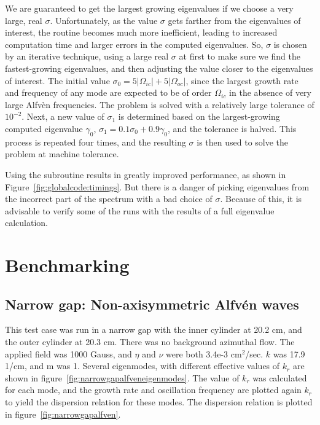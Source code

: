 \documentclass[letterpaper]{article}
\begin{document}
We are guaranteed to get the largest growing eigenvalues if we choose
a very large, real $\sigma$. Unfortunately, as the value $\sigma$ gets
farther from the eigenvalues of interest, the routine becomes much
more inefficient, leading to increased computation time and larger
errors in the computed eigenvalues. So, $\sigma$ is chosen by an
iterative technique, using a large real $\sigma$ at first to make sure
we find the fastest-growing eigenvalues, and then adjusting the value
closer to the eigenvalues of interest. The initial value $\sigma_0 =
5|\Omega_{ic}| + 5|\Omega_{oc}|$, since the largest growth rate and
frequency of any mode are expected to be of order $\Omega_{ic}$ in the
absence of very large Alfv\`{e}n frequencies. The problem is solved
with a relatively large tolerance of $10^{-2}$. Next, a new value of
$\sigma_1$ is determined based on the largest-growing computed
eigenvalue $\gamma_0$, $\sigma_1 = 0.1\sigma_0 + 0.9\gamma_0$, and the
tolerance is halved. This process is repeated four times, and the
resulting $\sigma$ is then used to solve the problem at machine
tolerance.

Using the \verb@ARPACK@ subroutine results in greatly improved
performance, as shown in Figure~\ref{fig:globalcode:timings}. But
there is a danger of picking eigenvalues from the incorrect part of
the spectrum with a bad choice of $\sigma$. Because of this, it is
advisable to verify some of the runs with the results of a full
eigenvalue calculation.

\section{Benchmarking}

\subsection{Narrow gap: Non-axisymmetric Alfv\'en waves}

This test case was run in a narrow gap with the inner cylinder at 20.2
cm, and the outer cylinder at 20.3 cm.  There was no background
azimuthal flow.  The applied field was 1000 Gauss, and $\eta$ and
$\nu$ were both 3.4e-3 cm$^2$/sec.  $k$ was 17.9 1/cm, and m was 1.
Several eigenmodes, with different effective values of $k_r$ are shown
in figure~\ref{fig:narrowgapalfveneigenmodes}.  The value of $k_r$ was
calculated for each mode, and the growth rate and oscillation
frequency are plotted again $k_r$ to yield the dispersion relation for
these modes.  The dispersion relation is plotted in
figure~\ref{fig:narrowgapalfven}.
\end{document}
